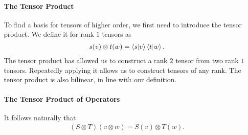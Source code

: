 \paragraph{The Tensor Product}
To find a basis for tensors of higher order, we first need to introduce the tensor product. We define it for rank $1$ tensors as
\begin{align*}
	s(v)\otimes t(w) = \braket{s}{v}\braket{t}{w}.
\end{align*}
The tensor product has allowed us to construct a rank $2$ tensor from two rank $1$ tensors. Repeatedly applying it allows us to construct tensors of any rank. The tensor product is also bilinear, in line with our definition.

\paragraph{The Tensor Product of Operators}
It follows naturally that
\begin{align*}
	(S\otimes T)(v\otimes w) = S(v)\otimes T(w).
\end{align*}